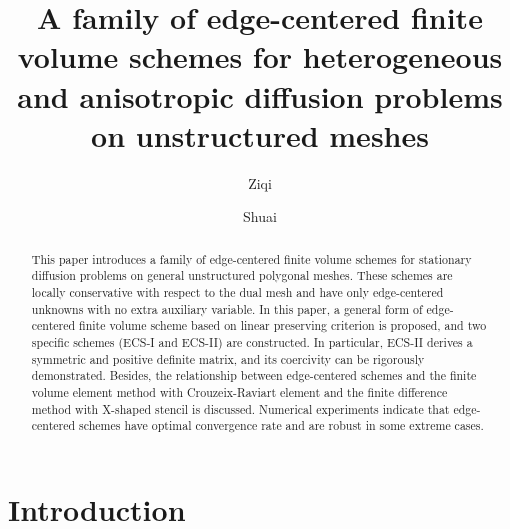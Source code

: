 \documentclass[times,review,preprint]{elsarticle}
\begin{document}

\begin{frontmatter}

\title{A family of edge-centered finite volume schemes for heterogeneous and anisotropic diffusion problems on unstructured meshes}

\author[1]{Ziqi }

\author[2]{Shuai }

\address[1]{Department of Mathematical Sciences, Tsinghua University, Beijing 100084, PR China}
\address[2]{Graduate School of China Academy of Engineering Physics,  Beijing, 100088, PR China}

\received{***}
\finalform{***}
\accepted{***}
\availableonline{***}
\communicated{***}

\begin{abstract}
This paper introduces a family of edge-centered finite volume schemes for stationary diffusion problems on general unstructured polygonal meshes. These schemes are locally conservative with respect to the dual mesh and have only edge-centered unknowns with no extra auxiliary variable.
In this paper, a general form of edge-centered finite volume scheme based on linear preserving criterion is proposed, and two specific schemes (ECS-I and ECS-II) are constructed. In particular, ECS-II derives a symmetric and positive definite matrix, and its coercivity can be rigorously demonstrated.
Besides, the relationship between edge-centered schemes and the finite volume element method with Crouzeix-Raviart element and the finite difference method with X-shaped stencil is discussed.
Numerical experiments indicate that edge-centered schemes have optimal convergence rate and are robust in some extreme cases.
\end{abstract}


\end{frontmatter}

\section{Introduction}\label{sec1}
\end{document}
